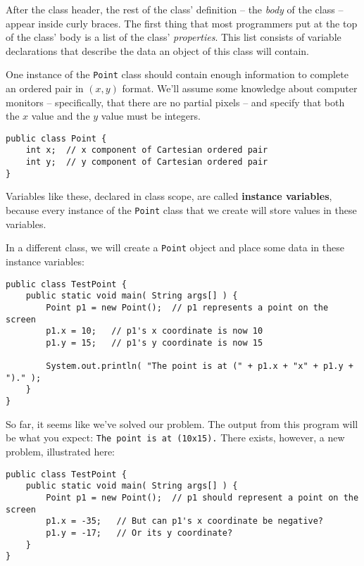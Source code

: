 After the class header, the rest of the class' definition -- the \textit{body} of the class -- appear inside curly braces.  The first thing that most programmers put at the top of the class' body is a list of the class' \textit{properties}.  This list consists of variable declarations that describe the data an object of this class will contain.

One instance of the \texttt{Point} class should contain enough information to complete an ordered pair in $(x,y)$ format.  We'll assume some knowledge about computer monitors -- specifically, that there are no partial pixels -- and specify that both the $x$ value and the $y$ value must be integers.

\begin{verbatim}
public class Point {
    int x;  // x component of Cartesian ordered pair
    int y;  // y component of Cartesian ordered pair
}
\end{verbatim}

Variables like these, declared in class scope, are called \textbf{instance variables}, because every instance of the \texttt{Point} class that we create will store values in these variables.

In a different class, we will create a \texttt{Point} object and place some data in these instance variables:

\begin{verbatim}
public class TestPoint {
    public static void main( String args[] ) {
        Point p1 = new Point();  // p1 represents a point on the screen
        p1.x = 10;   // p1's x coordinate is now 10
        p1.y = 15;   // p1's y coordinate is now 15

        System.out.println( "The point is at (" + p1.x + "x" + p1.y + ")." );
    }
}
\end{verbatim}

So far, it seems like we've solved our problem.  The output from this program will be what you expect: \texttt{The point is at (10x15).}  There exists, however, a new problem, illustrated here:

\begin{verbatim}
public class TestPoint {
    public static void main( String args[] ) {
        Point p1 = new Point();  // p1 should represent a point on the screen
        p1.x = -35;   // But can p1's x coordinate be negative?
        p1.y = -17;   // Or its y coordinate?
    }
}
\end{verbatim}


